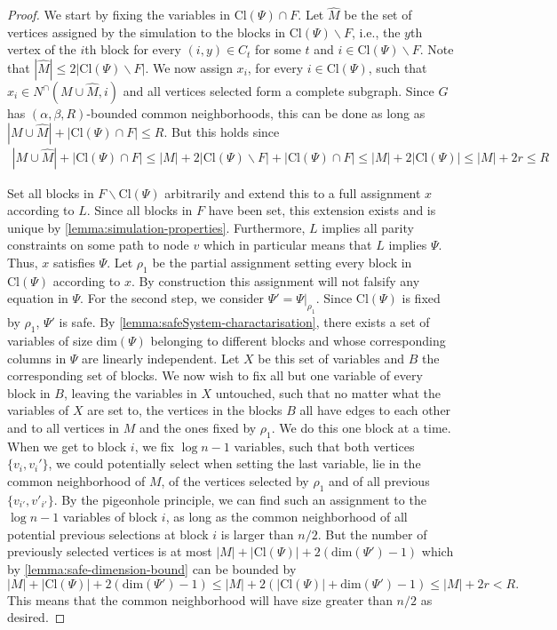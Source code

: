 \documentclass[10pt,a4paper]{article}
\theoremstyle{definition}
\theoremstyle{remark}
\theoremstyle{example}
\theoremstyle{plain}
\renewcommand{\setminus}{\smallsetminus}
\renewcommand{\hat}{\widehat}
\newcommand{\cl}{\mathrm{Cl}}
\newcommand{\CNbound}{R}
\begin{document}
{}{
\begin{proof}
    We start by fixing the variables in $\cl(\Psi)\cap F$. Let $\hat M$ be the set of vertices assigned by the simulation to the blocks in $\cl(\Psi)\setminus F$, i.e., the $y$th vertex of the $i$th block for every $(i,y)\in C_t$ for some $t$ and $i\in \cl(\Psi)\setminus F$. Note that $|\hat M|\leq 2|\cl(\Psi)\setminus F|$. We now assign $x_i$, for every $i\in \cl(\Psi)$, such that $x_i\in N^\cap(M\cup\hat M,i)$ and all vertices selected form a complete subgraph. Since $G$ has $(\alpha, \beta, R)$-bounded common neighborhoods, this can be done as long as $|M\cup\hat M|+|\cl(\Psi)\cap F|\leq \CNbound$. But this holds since 
    \begin{align*}
        |M\cup\hat M|+|\cl(\Psi)\cap F|\leq |M|+ 2|\cl(\Psi)\setminus F|+|\cl(\Psi)\cap F|\leq |M| + 2|\cl(\Psi)|\leq |M|+2r \leq \CNbound
    \end{align*}

    Set all blocks in $F\setminus \cl(\Psi)$ arbitrarily and extend this to a full assignment $x$ according to $L$. Since all blocks in $F$ have been set, this extension exists and is unique by \autoref{lemma:simulation-properties}. Furthermore, $L$ implies all parity constraints on some path to node $v$ which in particular means that $L$ implies $\Psi$. Thus, $x$ satisfies $\Psi$. Let $\rho_1$ be the partial assignment setting every block in $\cl(\Psi)$ according to $x$. By construction this assignment will not falsify any equation in $\Psi$. 
    For the second step, we consider $\Psi' = \Psi|_{\rho_1}$. Since $\cl(\Psi)$ is fixed by $\rho_1$, $\Psi'$ is safe. By \autoref{lemma:safeSystem-charactarisation}, there exists a set of variables of size $\mathrm{dim}(\Psi)$ belonging to different blocks and whose corresponding columns in $\Psi$ are linearly independent. Let $X$ be this set of variables and $B$ the corresponding set of blocks. We now wish to fix all but one variable of every block in $B$, leaving the variables in $X$ untouched, such that no matter what the variables of $X$ are set to, the vertices in the blocks $B$ all have edges to each other and to all vertices in $M$ and the ones fixed by $\rho_1$. We do this one block at a time. When we get to block $i$, we fix ${\log n}-1$ variables, such that both vertices $\{v_i,v_i'\}$, we could potentially select when setting the last variable, lie in the common neighborhood of $M$, of the vertices selected by $\rho_1$ and of all previous $\{v_{i'},v'_{i'}\}$. By the pigeonhole principle, we can find such an assignment to the ${\log n}-1$ variables of block $i$, as long as the common neighborhood of all potential previous selections at block $i$ is larger than $n/2$. But the number of previously selected vertices is at most $|M|+|\cl(\Psi)|+2(\mathrm{dim}(\Psi')-1)$ which by \autoref{lemma:safe-dimension-bound} can be bounded by 
    \begin{equation*}
        |M|+|\cl(\Psi)|+2(\mathrm{dim}(\Psi')-1) \leq |M|+2(|\cl(\Psi)|+\mathrm{dim}(\Psi')-1)\leq |M|+2r < R.
    \end{equation*}
    This means that the common neighborhood will have size greater than $n/2$ as desired.
    

\end{proof}}
\end{document}
